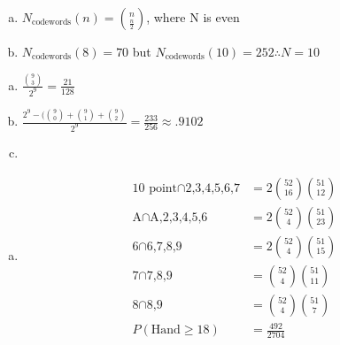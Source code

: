 \documentclass[12pt]{article}
\newenvironment{problem}[2][Problem]{\begin{trivlist}
\item[\hskip \labelsep {\bfseries #1}\hskip \labelsep {\bfseries #2.}]
  \vspace{1 cm}
}{\end{trivlist}}
\begin{document}
\begin{problem}{2.37}
\item
  \begin{enumerate}[a.]
    \item %
      $N_\textrm{codewords}(n) = \binom{n}{\frac{n}{2}}$, where N is even
    \item %
      $N_\textrm{codewords}(8) = 70$ but $N_\textrm{codewords}(10) = 252 \therefore N = 10$
  \end{enumerate}
\end{problem}

\begin{problem}{2.39} %
\item
  \begin{enumerate}[a.]
    \item %
      $\frac{\binom{9}{3}}{2^9} = \frac{21}{128}$
    \item %
      $\frac{2^9 - (\binom{9}{0} + \binom{9}{1} + \binom{9}{2}}{2^9} 
      =  \frac{233}{256} \approx .9102$
    \item %
  \end{enumerate}
\end{problem}

\begin{problem}{2.41} %
 \item
   \begin{enumerate}[a.]
    \ item %
      \begin{align*}
        \textrm{A} \cap \textrm{7,8,9,10,J,Q,K} &= 2 \binom{52}{4} \binom{51}{28} \\
        \textrm{Face Card, 10} \cap \textrm{8 or 9} &= 2 \binom{52}{16} \binom{51}{8} \\
        \textrm{Face Card, 10} \cap \textrm{Face Card, 10} &= 2 \binom{52}{16} \binom{51}{15} \\
        \textrm{9} \cap \textrm{9} &= \binom{52}{4} \binom{51}{3} \\
        P(\textrm{Hand} \geq 18) &= \frac{492}{2704}
       \end{align*}
    \item %
      \begin{align*}
        \textrm{10 point} \cap \textrm{2,3,4,5,6,7} &= 2 \binom{52}{16} \binom{51}{12} \\
        \textrm{A} \cap \textrm{A,2,3,4,5,6} &= 2 \binom{52}{4} \binom{51}{23} \\
        \textrm{6} \cap \textrm{6,7,8,9} &= 2 \binom{52}{4} \binom{51}{15} \\
        \textrm{7} \cap \textrm{7,8,9} &= \binom{52}{4} \binom{51}{11} \\
        \textrm{8} \cap \textrm{8,9} &= \binom{52}{4} \binom{51}{7} \\
        P(\textrm{Hand} \geq 18) &= \frac{492}{2704}
      \end{align*}
  \end{enumerate}
\end{problem}
\end{document}
